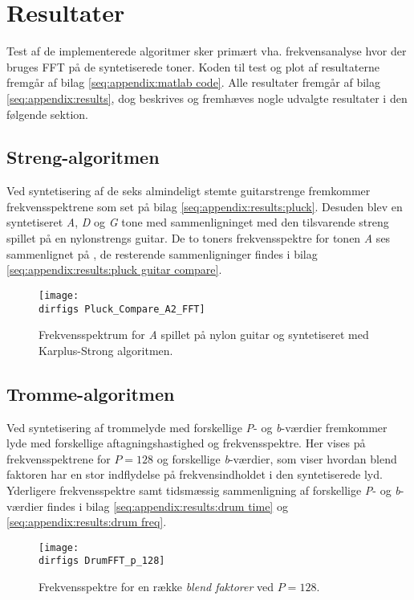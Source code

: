 \section{Resultater}

Test af de implementerede algoritmer sker primært vha. frekvensanalyse hvor der bruges FFT på de syntetiserede toner. Koden til test og plot af resultaterne fremgår af bilag \ref{seq:appendix:matlab code}. Alle resultater fremgår af bilag \ref{seq:appendix:results}, dog beskrives og fremhæves nogle udvalgte resultater i den følgende sektion.

\subsection{Streng-algoritmen}

Ved syntetisering af de seks almindeligt stemte guitarstrenge fremkommer frekvensspektrene som set på bilag \ref{seq:appendix:results:pluck}.
Desuden blev en syntetiseret \textit{A}, \textit{D} og \textit{G} tone med sammenligninget med den tilsvarende streng spillet på en nylonstrengs guitar\cite{NoteOnNylonGuitar}.
De to toners frekvensspektre for tonen \textit{A} ses sammenlignet på , de resterende sammenligninger findes i bilag \ref{seq:appendix:results:pluck guitar compare}.

\begin{figure}[!ht]
  \centering
  \texttt{[image: \\dirfigs Pluck\_Compare\_A2\_FFT]}
  \caption{Frekvensspektrum for \textit{A} spillet på nylon guitar og syntetiseret med Karplus-Strong algoritmen.}
  \label{fig:pluck compare A2 fft}
\end{figure}

\subsection{Tromme-algoritmen}

Ved syntetisering af trommelyde med forskellige \textit{P}- og \textit{b}-værdier fremkommer lyde med forskellige aftagningshastighed og frekvensspektre.
Her vises på  frekvensspektrene for \(P=128\) og forskellige \textit{b}-værdier, som viser hvordan blend faktoren har en stor indflydelse på frekvensindholdet i den syntetiserede lyd.
Yderligere frekvensspektre samt tidsmæssig sammenligning af forskellige \textit{P}- og \textit{b}-værdier findes i bilag \ref{seq:appendix:results:drum time} og \ref{seq:appendix:results:drum freq}.

\begin{figure}[!ht]
  \centering
  \texttt{[image: \\dirfigs DrumFFT\_p\_128]}
  \caption{Frekvensspektre for en række \textit{blend faktorer} ved \(P=128\).}
  \label{fig:drum fft p=128}
\end{figure}
